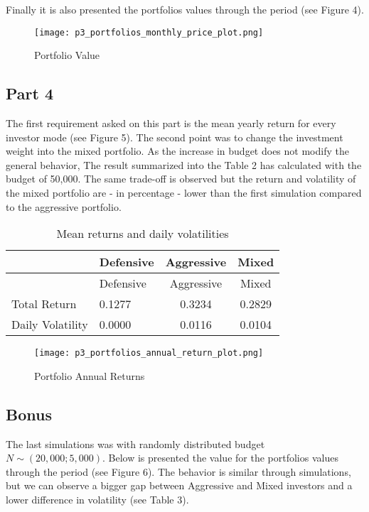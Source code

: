 \documentclass[
  11pt,
]{article}
\begin{document}
Finally it is also presented the portfolios values through the period (see Figure 4).

\begin{figure}
\centering
\texttt{[image: p3\_portfolios\_monthly\_price\_plot.png]}
\caption{Portfolio Value}
\end{figure}

\hypertarget{part-4}{%
\subsection{Part 4}\label{part-4}}

The first requirement asked on this part is the mean yearly return for every investor mode (see Figure 5). The second point was to change the investment weight into the mixed portfolio. As the increase in budget does not modify the general behavior, The result summarized into the Table 2 has calculated with the budget of 50,000. The same trade-off is observed but the return and volatility of the mixed portfolio are - in percentage - lower than the first simulation compared to the aggressive portfolio.

\begin{longtable}[]{@{}llcc@{}}
\caption{\label{tab:unnamed-chunk-4}Mean returns and daily volatilities}\tabularnewline
\toprule
& Defensive & Aggressive & Mixed\tabularnewline
\midrule
\endfirsthead
\toprule
& Defensive & Aggressive & Mixed\tabularnewline
\midrule
\endhead
Total Return & 0.1277 & 0.3234 & 0.2829\tabularnewline
Daily Volatility & 0.0000 & 0.0116 & 0.0104\tabularnewline
\bottomrule
\end{longtable}

\begin{figure}
\centering
\texttt{[image: p3\_portfolios\_annual\_return\_plot.png]}
\caption{Portfolio Annual Returns}
\end{figure}

\hypertarget{bonus}{%
\subsection{Bonus}\label{bonus}}

The last simulations was with randomly distributed budget \(N\sim(20,000; 5,000)\). Below is presented the value for the portfolios values through the period (see Figure 6). The behavior is similar through simulations, but we can observe a bigger gap between Aggressive and Mixed investors and a lower difference in volatility (see Table 3).
\end{document}
